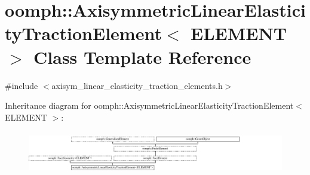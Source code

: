 \hypertarget{classoomph_1_1AxisymmetricLinearElasticityTractionElement}{}\section{oomph\+:\+:Axisymmetric\+Linear\+Elasticity\+Traction\+Element$<$ E\+L\+E\+M\+E\+NT $>$ Class Template Reference}
\label{classoomph_1_1AxisymmetricLinearElasticityTractionElement}


{\ttfamily \#include $<$axisym\+\_\+linear\+\_\+elasticity\+\_\+traction\+\_\+elements.\+h$>$}

Inheritance diagram for oomph\+:\+:Axisymmetric\+Linear\+Elasticity\+Traction\+Element$<$ E\+L\+E\+M\+E\+NT $>$\+:\begin{figure}[H]
\begin{center}
\leavevmode
\includegraphics[height=1.890295cm]{classoomph_1_1AxisymmetricLinearElasticityTractionElement}
\end{center}
\end{figure}
